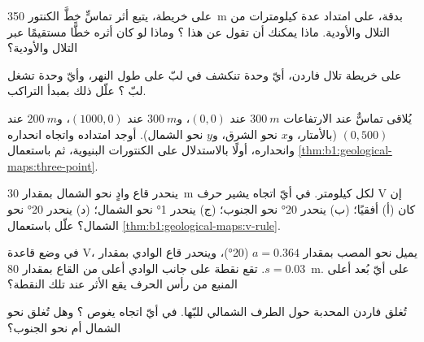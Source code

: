 \begin{exercise}[$\star$]\label{exo:b1:geological-maps:3}
على خريطة، يتبع أثر تماسٍّ خطَّ الكنتور \qty{350}{m} بدقة، على امتداد عدة كيلومترات من التلال والأودية. ماذا يمكنك أن تقول عن هذا ؟ وماذا لو كان أثره خطًّا مستقيمًا عبر التلال والأودية؟
\end{exercise}

\begin{exercise}[$\star$]\label{exo:b1:geological-maps:4}
على خريطة تلال فاردن، أيّ وحدة تنكشف في لبّ  على طول النهر، وأيّ وحدة تشغل لبّ ؟ علّل ذلك بمبدأ التراكب.
\end{exercise}

\begin{exercise}[$\star\star$]\label{exo:b1:geological-maps:5}
يُلاقى تماسٌّ عند الارتفاعات $\qty{300}{m}$ عند $(0, 0)$، و$\qty{300}{m}$ عند $(1000, 0)$، و$\qty{200}{m}$ عند $(0, 500)$ (بالأمتار، و$x$ نحو الشرق، و$y$ نحو الشمال). أوجد امتداده واتجاه انحداره وانحداره، أولًا بالاستدلال على الكنتورات البنيوية، ثم باستعمال \cref{thm:b1:geological-maps:three-point}.
\end{exercise}

\begin{exercise}[$\star\star$]\label{exo:b1:geological-maps:6}
ينحدر قاع وادٍ نحو الشمال بمقدار \qty{30}{m} لكل كيلومتر. في أيّ اتجاه يشير حرف V   إن كان  (أ) أفقيًا؛ (ب) ينحدر \ang{20} نحو الجنوب؛ (ج) ينحدر \ang{1} نحو الشمال؛ (د) ينحدر \ang{20} نحو الشمال؟ علّل باستعمال \cref{thm:b1:geological-maps:v-rule}.
\end{exercise}

\begin{exercise}[$\star\star$]\label{exo:b1:geological-maps:7}
في وضع قاعدة V، يميل  نحو المصب بمقدار $a = 0.364$ (\ang{20})، وينحدر قاع الوادي بمقدار $s = 0.03$. تقع نقطة على جانب الوادي أعلى من القاع بمقدار \qty{80}{m}. على أيّ بُعد أعلى المنبع من رأس الحرف يقع الأثر عند تلك النقطة؟
\end{exercise}

\begin{exercise}[$\star\star$]\label{exo:b1:geological-maps:8}
تُغلق   فاردن المحدبة حول الطرف الشمالي للبّها. في أيّ اتجاه يغوص ؟ وهل تُغلق   نحو الشمال أم نحو الجنوب؟
\end{exercise}

